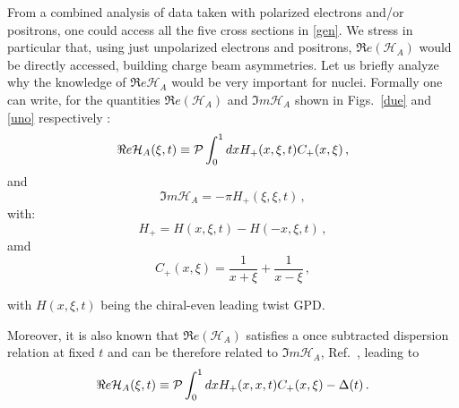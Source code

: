 \documentclass[times, twoside]{PosWhiPap}
\begin{document}
From a combined analysis of data taken with polarized electrons and/or 
positrons, one could access all the five cross sections in \eqref{gen}.
{We stress in particular that, using just unpolarized electrons and positrons, 
$\Re e(\mathcal{H}_{A})$ would be directly accessed, building charge beam 
asymmetries}. Let us briefly analyze why the knowledge of $\Re 
e\mathcal{H}_{A}$ would be very important for nuclei. Formally one can write,
for the quantities $\Re e(\mathcal{H}_{A})$ and $\Im m \mathcal{H}_{A}$
shown in Figs.~\ref{due} and \ref{uno} respectively \cite{Guidal:2013rya}:
\begin{equation}
\Re e \mathcal{H}_{A} (\xi,t) \equiv 
{\cal P} \int_0^1 dx H_+(x,\xi,t) C_+(x,\xi) \, ,
\label{ReC}
\end{equation}
and
\begin{equation}
  \Im m \mathcal{H}_{A} = -\pi H_+(\xi,\xi,t)  \, ,
\end{equation}
with:
\begin{equation}
    H_+ = H(x,\xi,t)-H(-x,\xi,t) \, ,
\end{equation}
amd
\begin{equation}
    C_+(x,\xi) = \frac{1}{x+\xi}+\frac{1}{x-\xi} \, ,
\end{equation}

with $H(x,\xi,t)$ being the chiral-even leading twist GPD.


Moreover, it is also known that $\Re e(\mathcal{H}_{A})$ satisfies {\color{red} 
a once subtracted } dispersion relation at fixed $t$ and can be therefore 
related to $\Im m \mathcal{H}_{A}$, 
Ref.~\cite{Anikin:2007yh,Diehl:2007jb,Radyushkin:2011dh,Pasquini:2014vua}, 
leading to \begin{equation}
\Re e \mathcal{H}_{A} (\xi,t) \equiv
{\cal P} \int_0^1 dx H_+(x,x,t) C_+(x,\xi)
- \Delta(t) \, .
\label{disp}
\end{equation}
\end{document}
